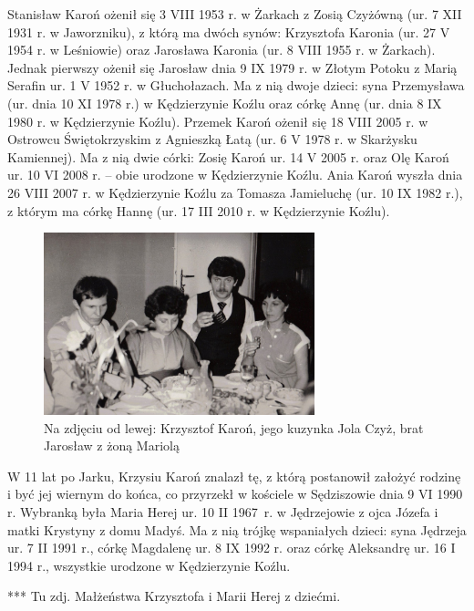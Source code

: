 Stanisław Karoń ożenił się 3 VIII 1953 r. w Żarkach z Zosią Czyżówną (ur. 7 XII 1931 r. w Jaworzniku), z którą ma dwóch synów: Krzysztofa Karonia (ur. 27 V 1954 r. w Leśniowie) oraz Jarosława Karonia (ur. 8 VIII 1955 r. w Żarkach). Jednak pierwszy ożenił się Jarosław dnia 9 IX 1979 r. w Złotym Potoku z Marią Serafin ur. 1 V 1952 r. w Głuchołazach. Ma z nią dwoje dzieci: syna Przemysława (ur. dnia 10 XI 1978 r.) w Kędzierzynie Koźlu oraz córkę Annę (ur. dnia 8 IX 1980 r. w Kędzierzynie Koźlu). Przemek Karoń ożenił się 18 VIII 2005 r. w Ostrowcu Świętokrzyskim z Agnieszką Łatą (ur. 6 V 1978 r. w Skarżysku Kamiennej). Ma z nią dwie córki: Zosię Karoń ur. 14 V 2005 r. oraz Olę Karoń ur. 10 VI 2008 r. -- obie urodzone w Kędzierzynie Koźlu. Ania Karoń wyszła dnia 26 VIII 2007 r. w Kędzierzynie Koźlu za Tomasza Jamieluchę (ur. 10 IX 1982 r.), z którym ma córkę Hannę (ur. 17 III 2010 r. w Kędzierzynie Koźlu).

\begin{figure}
\begin{center}
\includegraphics[width=0.7\textwidth]{zdjecia/krzysztof_karon_jarek_karon_z_zona.jpg}
\caption[Krzysztof, Jarosław i Mariola Karoniowie]{Na zdjęciu od lewej: Krzysztof Karoń, jego kuzynka Jola Czyż, brat Jarosław z żoną Mariolą}
\label{rys:krzysztof_karon_jarek_karon_z_zona.jpg}
\end{center}
\end{figure}

W 11 lat po Jarku, Krzysiu Karoń znalazł tę, z którą postanowił założyć rodzinę i być jej wiernym do końca, co przyrzekł w kościele w Sędziszowie dnia 9 VI 1990 r. Wybranką była Maria Herej ur. 10 II 1967~r. w Jędrzejowie z ojca Józefa i matki Krystyny z domu Madyś. Ma z nią trójkę wspaniałych dzieci: syna Jędrzeja ur. 7 II 1991 r., córkę Magdalenę ur. 8 IX 1992 r. oraz córkę Aleksandrę ur. 16 I 1994 r., wszystkie urodzone w Kędzierzynie Koźlu.


{\color{red}
*** Tu zdj. Małżeństwa Krzysztofa i Marii Herej z dziećmi.}